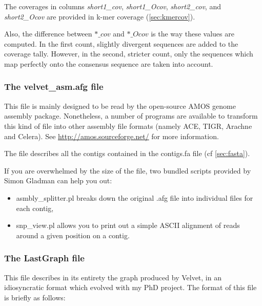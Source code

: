 \documentclass{article}
\begin{document}
The coverages in columns \emph{short1\_cov}, \emph{short1\_Ocov}, \emph{short2\_cov}, and \emph{short2\_Ocov} are provided in k-mer coverage (\ref{sec:kmercov}).

Also, the difference between $*\_cov$ and $*\_Ocov$ is the way these values are computed. In the first count, slightly divergent sequences are added to the coverage tally. However, in the second, stricter count, only the sequences which map perfectly onto the consensus sequence are taken into account.

\subsubsection{The velvet\_asm.afg file}

\label{sec:amos}

This file is mainly designed to be read by the open-source AMOS genome assembly package. Nonetheless, a number of programs are available to transform this kind of file into other assembly file formats (namely ACE, TIGR, Arachne and Celera). See \href{http://amos.sourceforge.net/}{http://amos.sourceforge.net/} for more information.

The file describes all the contigs contained in the contigs.fa file (cf \ref{sec:fasta}). 

If you are overwhelmed by the size of the file, two bundled scripts provided by Simon Gladman can help you out:
\begin{itemize}
\item asmbly\_splitter.pl breaks down the  original .afg file into individual files for each contig,
\item snp\_view.pl allows you to print out a simple ASCII alignment of reads around a given position on a contig.
\end{itemize}

\subsubsection{The LastGraph file}

This file describes in its entirety the graph produced by Velvet, in an idiosyncratic format which evolved with my PhD project. The format of this file is briefly as follows:
\end{document}
